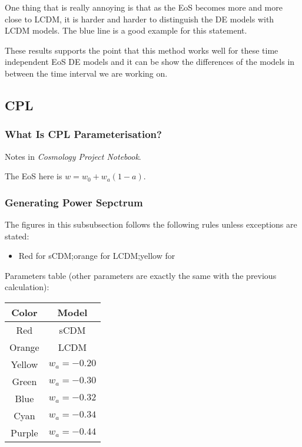 \documentclass{article}
\begin{document}
One thing that is really annoying is that as the EoS becomes more and more close to LCDM, it is harder and harder to distinguish the DE models with LCDM models. The blue line is a good example for this statement.



These results supports the point that this method works well for these time independent EoS DE models and it can be show the differences of the models in between the time interval we are working on.











\subsection{CPL}


\subsubsection{What Is CPL Parameterisation?}

Notes in {\it Cosmology Project Notebook}.

The EoS here is $w=w_0+w_a(1-a)$.

\subsubsection{Generating Power Sepctrum}

The figures in this subsubsection follows the following rules unless exceptions are stated:
\begin{itemize}
\item
Red for sCDM;orange for LCDM;yellow for 

\end{itemize}

Parameters table (other parameters are exactly the same with the previous calculation):

\vspace{2ex}
\begin{center}
\begin{tabular}{|c|c|}\hline
{\bf Color} & {\bf Model} \\\hline
Red & sCDM \\\hline
Orange & LCDM \\\hline
Yellow & $w_a=-0.20$ \\ \hline
Green &  $w_a=-0.30$ \\ \hline
Blue & $w_a=-0.32$ \\ \hline
Cyan & $w_a=-0.34$ \\ \hline
Purple & $w_a=-0.44$ \\ \hline
\end{tabular}
\end{center}
\vspace{2ex}
\end{document}

